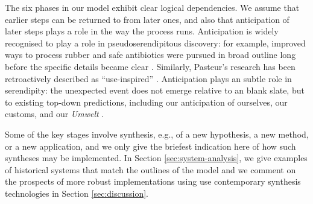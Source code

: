 The six phases in our model exhibit clear logical dependencies.%
We assume that earlier steps can be returned to from later ones, and
also that anticipation of later steps plays a role in the way the
process runs.  Anticipation is widely recognised to play a role in
pseudoserendipitous discovery: for example, improved ways to process
rubber and safe antibiotics were pursued in broad outline long before
the specific details became clear \cite{fleming,goodyear1855gum}.
Similarly, Pasteur's research has been retroactively described as
``use-inspired'' \cite{stokes1997pasteur}.  Anticipation plays an
subtle role in serendipity: the unexpected event does not emerge
relative to an blank slate, but to existing top-down predictions,
including our anticipation of ourselves, our customs, and our
\emph{Umwelt} \cite{dennett_2013}.

Some of the key stages involve synthesis, e.g., of a new hypothesis, a
new method, or a new application, and we only give the briefest
indication here of how such syntheses may be implemented.  In Section
\ref{sec:system-analysis}, we give examples of historical systems that
match the outlines of the model and we comment on the prospects of
more robust implementations using use contemporary synthesis
technologies in Section \ref{sec:discussion}.




